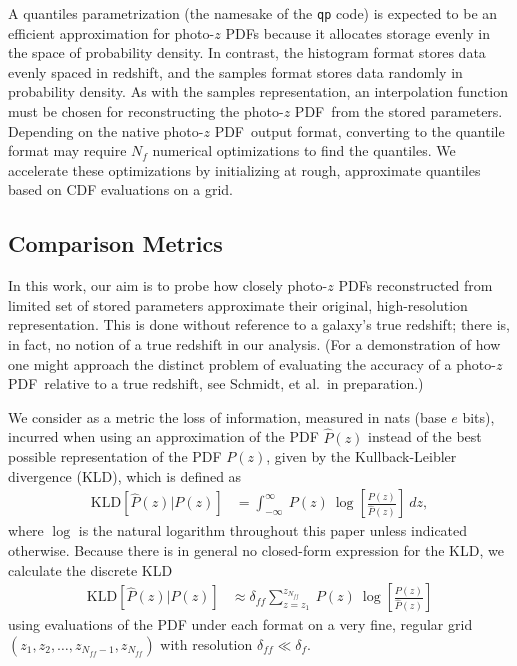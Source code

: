 \documentclass[\docopts]{\docclass}
\newcommand{\pz}{photo-$z$ PDF}
\begin{document}
A quantiles parametrization (the namesake of the \texttt{qp} code) is expected 
to be an efficient approximation for \pz s because it allocates storage evenly 
in the space of probability density.
In contrast, the histogram format stores data evenly spaced in redshift, and 
the samples format stores data randomly in probability density.
As with the samples representation, an interpolation function must be chosen 
for reconstructing the \pz\ from the stored parameters.
Depending on the native \pz\ output format, converting to the quantile format 
may require $N_{f}$ numerical optimizations to find the quantiles.
We accelerate these optimizations by initializing at rough, approximate 
quantiles based on CDF evaluations on a grid.





\subsection{Comparison Metrics}
\label{sec:metric}

In this work, our aim is to probe how closely \pz s reconstructed from limited 
set of stored parameters approximate their original, high-resolution 
representation.
This is done without reference to a galaxy's true redshift; there is, in fact, 
no notion of a true redshift in our analysis.
(For a demonstration of how one might approach the distinct problem of 
evaluating the accuracy of a \pz\ relative to a true redshift, see Schmidt, et 
al.\ in preparation.)

We consider as a metric the loss of information, measured in nats (base $e$ 
bits), incurred when using an approximation of the PDF $\hat{P}(z)$ instead of 
the best possible representation of the  PDF $P(z)$, given by the 
Kullback-Leibler divergence (KLD), which is defined as
\begin{align}
  \label{eq:kld}
  \mathrm{KLD}[\hat{P}(z) | P(z)] &= \int_{-\infty}^{\infty}\ P(z)\ 
\log\left[\frac{P(z)}{\hat{P}(z)}\right]\ dz,
\end{align}
where $\log$ is the natural logarithm throughout this paper unless indicated 
otherwise.
Because there is in general no closed-form expression for the KLD, we calculate 
the discrete KLD
\begin{align}
  \label{eq:kld_approx}
  \mathrm{KLD}[\hat{P}(z) | P(z)] &\approx 
\delta_{ff}\sum_{z=z_{1}}^{z_{N_{ff}}}\ P(z)\ 
\log\left[\frac{P(z)}{\hat{P}(z)}\right]
\end{align}
using evaluations of the PDF under each format on a very fine, regular grid 
$(z_{1}, z_{2}, \dots, z_{N_{ff}-1}, z_{N_{ff}})$ with resolution 
$\delta_{ff}\ll\delta_{f}$.
\end{document}

